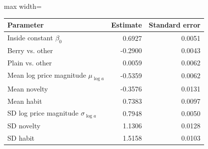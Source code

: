 \begin{adjustbox}{max width=\linewidth}
\begin{tabular}{lrr}\toprule
Parameter & Estimate & Standard error\\\midrule
Inside constant $\beta_0$ & 0.6927 & 0.0051 \\
Berry vs. other & -0.2900 & 0.0043 \\
Plain vs. other & 0.0059 & 0.0062 \\
Mean log price magnitude $\mu_{\log a}$ & -0.5359 & 0.0062 \\
Mean novelty & -0.3576 & 0.0131 \\
Mean habit & 0.7383 & 0.0097 \\
SD log price magnitude $\sigma_{\log a}$ & 0.7948 & 0.0050 \\
SD novelty & 1.1306 & 0.0128 \\
SD habit & 1.5158 & 0.0103 \\
\bottomrule\end{tabular}
\end{adjustbox}

